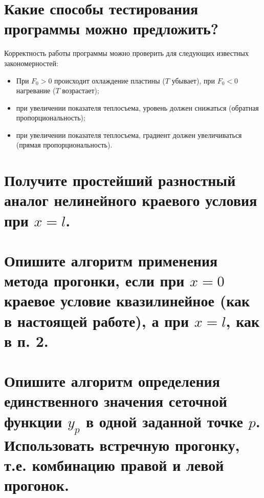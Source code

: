 \section{Какие способы тестирования программы можно предложить?}

Корректность работы программы можно проверить для следующих известных закономерностей:
\begin{itemize}
    \item При $F_0 > 0$ происходит охлаждение пластины ($T$ убывает), при $F_0 < 0$ нагревание ($T$ возрастает);
    \item при увеличении показателя теплосъема, уровень должен снижаться (обратная пропорциональность);
    \item при увеличении показателя теплосъема, градиент должен увеличиваться (прямая пропорциональность).
\end{itemize}

\clearpage

\section{Получите простейший разностный аналог нелинейного краевого условия при $x = l$.}



\section{Опишите алгоритм применения метода прогонки, если при $x = 0$ краевое условие квазилинейное (как в настоящей работе), а при $x = l$, как в п. 2.}


\clearpage

\section{Опишите алгоритм определения единственного значения сеточной функции $y_p$ в одной заданной точке $p$. Использовать встречную прогонку, т.е. комбинацию правой и левой прогонок.}

